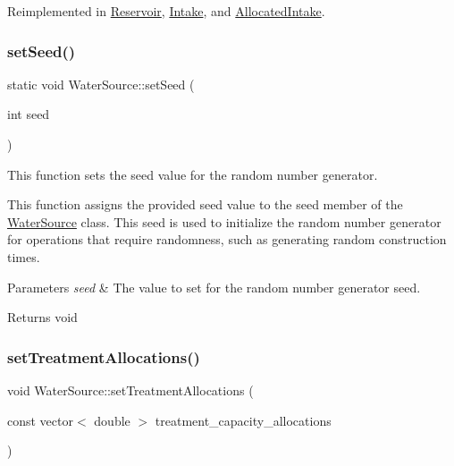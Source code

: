 Reimplemented in \mbox{\hyperlink{classReservoir_ad1bb7aa46397719d09e0b6188b9bc28d}{Reservoir}}, \mbox{\hyperlink{classIntake_a879c4c780a4d21606e848f57464cf3b6}{Intake}}, and \mbox{\hyperlink{classAllocatedIntake_afc73ae38f23417cfbece54c4c3d4ccc9}{Allocated\+Intake}}.

\mbox{\label{classWaterSource_a4c8f4c120b9101767b6013a78eb2c5d4}} 
\subsubsection{\texorpdfstring{set\+Seed()}{setSeed()}}
{\footnotesize\ttfamily static void Water\+Source\+::set\+Seed (\begin{DoxyParamCaption}\item[{int}]{seed }\end{DoxyParamCaption})\hspace{0.3cm}{\ttfamily [static]}}



This function sets the seed value for the random number generator. 

This function assigns the provided seed value to the {\ttfamily seed} member of the {\ttfamily \mbox{\hyperlink{classWaterSource}{Water\+Source}}} class. This seed is used to initialize the random number generator for operations that require randomness, such as generating random construction times.


\begin{DoxyParams}{Parameters}
{\em seed} & The value to set for the random number generator seed.\\
\hline
\end{DoxyParams}
\begin{DoxyReturn}{Returns}
void 
\end{DoxyReturn}
\mbox{\label{classWaterSource_abc7034b8c78e45d7b1fa4bd13b8a3bdd}} 
\subsubsection{\texorpdfstring{set\+Treatment\+Allocations()}{setTreatmentAllocations()}}
{\footnotesize\ttfamily void Water\+Source\+::set\+Treatment\+Allocations (\begin{DoxyParamCaption}\item[{const vector$<$ double $>$}]{treatment\+\_\+capacity\+\_\+allocations }\end{DoxyParamCaption})}



